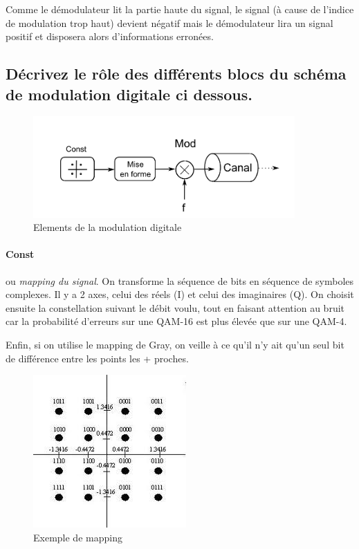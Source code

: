 Comme le démodulateur lit la partie haute du signal, le signal (à cause de l'indice de modulation trop haut) devient négatif mais le démodulateur lira un signal positif et disposera alors d'informations erronées.

\subsection{Décrivez le rôle des différents blocs du schéma de modulation digitale ci dessous.}
\begin{figure}[H]
  \centering
  \includegraphics[width=10cm]{img/exo.png}
  \caption{Elements de la modulation digitale}
\end{figure}

\paragraph{Const} ou \textit{mapping du signal}. On transforme la séquence de bits en séquence de symboles complexes. Il y a 2 axes, celui des réels (I) et celui des imaginaires (Q). On choisit  ensuite la constellation suivant le débit voulu, tout en faisant attention au bruit car la probabilité d'erreurs sur une QAM-16 est plus élevée que sur une
QAM-4.

Enfin, si on utilise le mapping de Gray, on veille à ce qu'il n'y ait qu'un seul bit de différence entre les points les + proches.

\begin{figure}[H]
    \centering
    \includegraphics[width=0.5\linewidth]{img/mapping.png}
    \caption{Exemple de mapping}
\end{figure}

